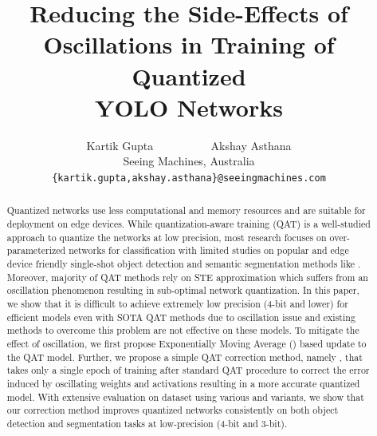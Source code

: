 \documentclass[10pt,twocolumn,letterpaper]{article}
\begin{document}
\title{Reducing the Side-Effects of Oscillations in Training of Quantized  \\ YOLO Networks}



\author{%
  Kartik Gupta ~~~~~~~~~
  Akshay Asthana %
\\
Seeing Machines, Australia\\
{\tt\small \{kartik.gupta,akshay.asthana\}@seeingmachines.com}\\
}

\maketitle

\begin{abstract}
Quantized networks use less computational and memory resources and are suitable for deployment on edge devices. While quantization-aware training (\acrshort{QAT}) is a well-studied approach to quantize the networks at low precision, most research focuses on over-parameterized networks for classification with limited studies on popular and edge device friendly single-shot object detection and semantic segmentation methods like \yolo. Moreover, majority of \acrshort{QAT} methods rely on \gls{STE} approximation which suffers from an oscillation phenomenon resulting in sub-optimal network quantization. In this paper, we show that it is difficult to achieve extremely low precision (4-bit and lower) for efficient \yolo models even with SOTA \acrshort{QAT} methods due to oscillation issue and existing methods to overcome this problem are not effective on these models. To mitigate the effect of oscillation, we first propose Exponentially Moving Average (\exma{}) based update to the \acrshort{QAT} model. Further, we propose a simple \acrshort{QAT} correction method, namely \qc{}, that takes only a single epoch of training after standard \gls{QAT} procedure to correct the error induced by oscillating weights and activations resulting in a more accurate quantized model. With extensive evaluation on \coco dataset using various \yoloa and \yolob variants, we show that our correction method improves quantized \yolo networks consistently on both object detection and segmentation tasks at low-precision (4-bit and 3-bit).

\end{abstract}








\end{document}
